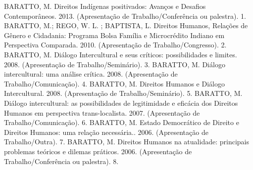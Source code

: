 
\begin{cvhonors}
  \cvhonor
    {BARATTO, M.}
    {Direitos Indígenas positivados: Avanços e Desafios Contemporâneos. 2013. (Apresentação de Trabalho/Conferência ou palestra).}
    {}
    {1. }
  \cvhonor
    {BARATTO, M.; REGO, W. L. ; BAPTISTA, L.}
    {Direitos Humanos, Relações de Gênero e Cidadania: Programa Bolsa Família e Microcrédito Indiano em Perspectiva Comparada. 2010. (Apresentação de Trabalho/Congresso).}
    {}
    {2. }
  \cvhonor
    {BARATTO, M.}
    {Diálogo Intercultural e seus críticos: possibilidades e limites. 2008. (Apresentação de Trabalho/Seminário).}
    {}
    {3. }
  \cvhonor
    {BARATTO, M.}
    {Diálogo intercultural: uma análise crítica. 2008. (Apresentação de Trabalho/Comunicação).}
    {}
    {4. }
  \cvhonor
    {BARATTO, M.}
    {Direitos Humanos e Diálogo Intercultural. 2008. (Apresentação de Trabalho/Seminário).}
    {}
    {5. }
  \cvhonor
    {BARATTO, M.}
    {Diálogo intercultural: as possibilidades de legitimidade e eficácia dos Direitos Humanos em perspectiva trans-localista. 2007. (Apresentação de Trabalho/Comunicação).}
    {}
    {6. }
  \cvhonor
    {BARATTO, M.}
    {Estado Democrático de Direito e Direitos Humanos: uma relação necessária.. 2006. (Apresentação de Trabalho/Outra).}
    {}
    {7. }
  \cvhonor
    {BARATTO, M.}
    {Direitos Humanos na atualidade: principais problemas teóricos e dilemas práticos. 2006. (Apresentação de Trabalho/Conferência ou palestra).}
    {}
    {8. }
\end{cvhonors}


